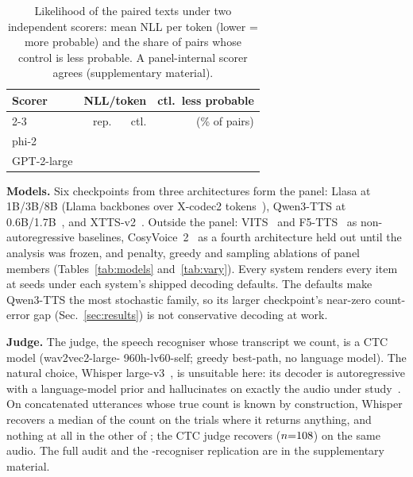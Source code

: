\documentclass{article}
\newcommand{\tabsize}{\small}
\begin{document}
\begin{table}[t]
\centering
\caption{Likelihood of the paired texts under two independent scorers:
mean NLL per token (lower = more probable) and the share of
\NllIndPairs{} pairs whose control is less probable. A panel-internal
scorer agrees (supplementary material).}
\label{tab:nll}
{\tabsize\setlength{\tabcolsep}{4pt}
\begin{tabular}{lrrr}
\toprule
Scorer & \multicolumn{2}{c}{NLL/token} & ctl.\ less probable \\
\cmidrule(lr){2-3}
 & rep. & ctl. & (\% of pairs) \\
\midrule
phi-2       & \NllPhiRep{} & \NllPhiCtl{} & \NllIndCtlHigherPct{} \\
GPT-2-large & \NllGptRep{} & \NllGptCtl{} & \NllGptPct{} \\
\bottomrule
\end{tabular}}
\end{table}

\textbf{Models.}
Six checkpoints from three architectures form the panel: Llasa at 1B/3B/8B
(Llama backbones over X-codec2 tokens~\cite{ye2025llasa}), Qwen3-TTS at
0.6B/1.7B~\cite{hu2026qwen3tts}, and XTTS-v2~\cite{casanova2024xtts}.
Outside the panel: VITS~\cite{kim2021vits} and F5-TTS~\cite{chen2024f5tts}
as non-autoregressive baselines, CosyVoice~2~\cite{du2024cosyvoice2} as a
fourth architecture held out until the
analysis was frozen, and penalty, greedy and sampling ablations of panel
members (Tables~\ref{tab:models} and~\ref{tab:vary}). Every system renders every item at
\NSeeds{} seeds under each system's shipped decoding defaults. The defaults make
Qwen3-TTS the most stochastic family, so its larger checkpoint's
near-zero count-error gap (Sec.~\ref{sec:results}) is not conservative
decoding at work.

\textbf{Judge.}
The judge, the speech recogniser whose transcript we count, is a CTC
model ({\ttfamily wav2vec2-\allowbreak large-\allowbreak
960h-\allowbreak lv60-\allowbreak self}; greedy best-path, no language
model). The natural choice, Whisper large-v3~\cite{radford2023whisper}, is
unsuitable here: its decoder is autoregressive with a language-model prior
and hallucinates on exactly the audio under
study~\cite{viakhirev2026dispersion}. On concatenated utterances whose true count is known by construction,
Whisper recovers a median
\JudgeScaleWhisperMed{} of the count on the \JudgeScaleNWhisper{} trials
where it returns anything, and nothing at all in the other
\JudgeScaleNWhisperErr{} of \JudgeScaleNWhisperAll{}; the CTC judge
recovers \JudgeScaleCtcMed{} ($n{=}108{}$) on the same audio.
The full audit and the \IndNJudges{}-recogniser replication are in the
supplementary material.
\end{document}
